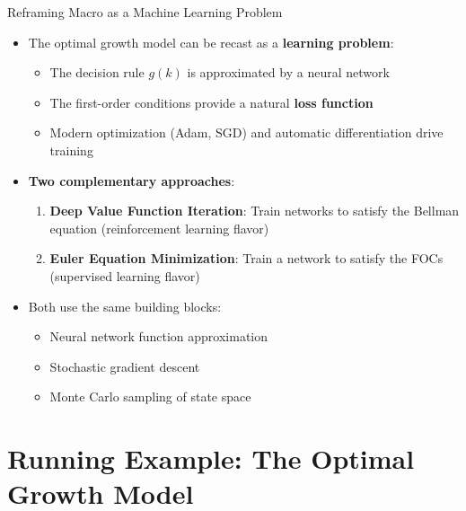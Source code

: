 \documentclass[10pt,english,aspectratio=169]{beamer}
\begin{document}
\begin{frame}{Reframing Macro as a Machine Learning Problem}
\begin{itemize}
  \item The optimal growth model can be recast as a \textbf{learning problem}:
    \begin{itemize}
      \item The decision rule $g(k)$ is approximated by a neural network
      \item The first-order conditions provide a natural \textbf{loss function}
      \item Modern optimization (Adam, SGD) and automatic differentiation drive training
    \end{itemize}
  \medskip
  \item \textbf{Two complementary approaches}:
    \begin{enumerate}
      \item \textbf{Deep Value Function Iteration}: Train networks to satisfy the Bellman equation (reinforcement learning flavor)
      \item \textbf{Euler Equation Minimization}: Train a network to satisfy the FOCs (supervised learning flavor)
    \end{enumerate}
  \medskip
  \item Both use the same building blocks:
    \begin{itemize}
      \item Neural network function approximation
      \item Stochastic gradient descent
      \item Monte Carlo sampling of state space
    \end{itemize}
\end{itemize}
\end{frame}


\section{Running Example: The Optimal Growth Model}
\end{document}
